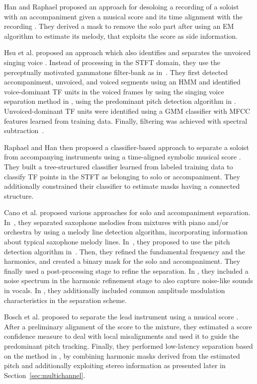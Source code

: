 Han and Raphael proposed an approach for desoloing a recording of a soloist with an accompaniment given a musical score and its time alignment with the recording \cite{han07}. They derived a mask \cite{roweis01} to remove the solo part after using an EM algorithm to estimate its melody, that exploits the score as side information.

Hsu et al. proposed an approach which also identifies and separates the unvoiced singing voice \cite{hsu08,hsu10}. Instead of processing in the STFT domain, they use the perceptually motivated gammatone filter-bank as in~\cite{hu02,li07}. They first detected accompaniment, unvoiced, and voiced segments using an HMM and identified voice-dominant TF units in the voiced frames by using the singing voice separation method in \cite{li07}, using the predominant pitch detection algorithm in \cite{dressler062}. Unvoiced-dominant TF units were identified using a GMM classifier with MFCC features learned from training data. Finally, filtering was achieved with spectral subtraction~\cite{scalart96}.

Raphael and Han then proposed a classifier-based approach to separate a soloist from accompanying instruments using a time-aligned symbolic musical score \cite{raphael08}. They built a tree-structured classifier \cite{breiman84} learned from labeled training data to classify TF points in the STFT as belonging to solo or accompaniment. They additionally constrained their classifier to estimate masks having a connected structure.

Cano et al. proposed various approaches for solo and accompaniment separation. In~\cite{cano09}, they separated saxophone melodies from mixtures with piano and/or orchestra by using a melody line detection algorithm, incorporating information about typical saxophone melody lines. In~\cite{grollmisch11,dittmar12,cano12}, they proposed to use the pitch detection algorithm in~\cite{dressler11}. Then, they refined the fundamental frequency and the harmonics, and created a binary mask for the solo and accompaniment. They finally used a post-processing stage to refine the separation. In \cite{cano13}, they included a noise spectrum in the harmonic refinement stage to also capture noise-like sounds in vocals. In \cite{cano14}, they additionally included common amplitude modulation characteristics in the separation scheme.

Bosch et al. proposed to separate the lead instrument using a musical score \cite{bosch12}. After a preliminary alignment of the score to the mixture, they estimated a score confidence measure to deal with local misalignments and used it to guide the predominant pitch tracking. Finally, they performed low-latency separation based on the method in \cite{marxer12}, by combining harmonic masks derived from the estimated pitch and additionally exploiting stereo information as presented later in Section~\ref{sec:multichannel}.

